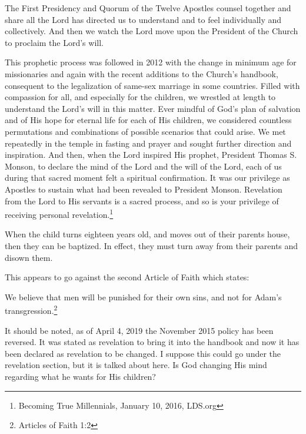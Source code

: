 \begin{displayquote}
The First Presidency and Quorum of the Twelve Apostles counsel together and share all 
the Lord has directed us to understand and to feel individually and collectively. 
And then we watch the Lord move upon the President of the Church to proclaim the 
Lord's will.

This prophetic process was followed in 2012 with the change in minimum age for 
missionaries and again with the recent additions to the Church’s handbook, consequent 
to the legalization of same-sex marriage in some countries. Filled with compassion 
for all, and especially for the children, we wrestled at length to understand the 
Lord's will in this matter. Ever mindful of God’s plan of salvation and of His hope 
for eternal life for each of His children, we considered countless permutations and 
combinations of possible scenarios that could arise. We met repeatedly in the temple 
in fasting and prayer and sought further direction and inspiration. And then, when 
the Lord inspired His prophet, President Thomas S. Monson, to declare the mind of 
the Lord and the will of the Lord, each of us during that sacred moment felt a 
spiritual confirmation. It was our privilege as Apostles to sustain what had been 
revealed to President Monson. Revelation from the Lord to His servants is a sacred 
process, and so is your privilege of receiving personal revelation.\footnote{
Becoming True Millennials, January 10, 2016, LDS.org
}
\end{displayquote}

When the child turns eighteen years old, and moves out of their parents house, then
they can be baptized. In effect, they must turn away from their parents and disown
them.

This appears to go against the second Article of Faith which states:

\begin{displayquote}
We believe that men will be punished for their own sins, and not for Adam's 
transgression.\footnote{Articles of Faith 1:2}
\end{displayquote}

It should be noted, as of April 4, 2019 the November 2015 policy has been reversed.
It was stated as revelation to bring it into the handbook and now it has been
declared as revelation to be changed. I suppose this could go under the revelation
section, but it is talked about here. Is God changing His mind regarding what he
wants for His children?

